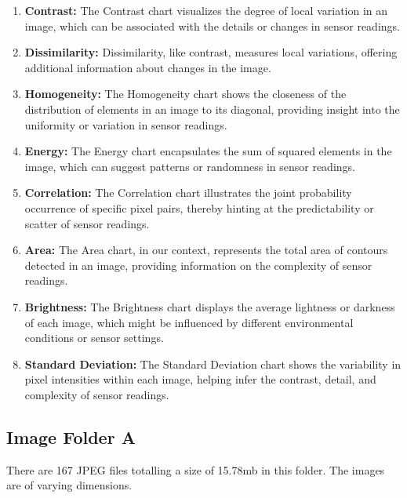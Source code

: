 \begin{enumerate}
\begin{enumerate}
              \item \textbf{Contrast:} The Contrast chart visualizes the degree of local variation in an image, which can be associated with the details or changes in sensor readings.
              \item \textbf{Dissimilarity:} Dissimilarity, like contrast, measures local variations, offering additional information about changes in the image.
              \item \textbf{Homogeneity:} The Homogeneity chart shows the closeness of the distribution of elements in an image to its diagonal, providing insight into the uniformity or variation in sensor readings.
              \item \textbf{Energy:} The Energy chart encapsulates the sum of squared elements in the image, which can suggest patterns or randomness in sensor readings.
              \item \textbf{Correlation:} The Correlation chart illustrates the joint probability occurrence of specific pixel pairs, thereby hinting at the predictability or scatter of sensor readings.
              \item \textbf{Area:} The Area chart, in our context, represents the total area of contours detected in an image, providing information on the complexity of sensor readings.
              \item \textbf{Brightness:} The Brightness chart displays the average lightness or darkness of each image, which might be influenced by different environmental conditions or sensor settings.
              \item \textbf{Standard Deviation:} The Standard Deviation chart shows the variability in pixel intensities within each image, helping infer the contrast, detail, and complexity of sensor readings.
          \end{enumerate}


\end{enumerate}

\newpage

\subsection{Image Folder A}

There are 167 JPEG files totalling a size of 15.78mb in this folder. The images are of varying dimensions.

